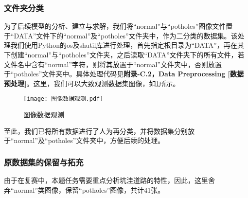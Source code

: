 \documentclass{MathorCupmodeling}
\begin{document}
\begin{table}[H]
	\centering
	\caption{异常标注图片的处理}
	\label{tab:异常图片处理}
\end{table}

  
	\subsubsection{文件夹分类}
	为了后续模型的分析、建立与求解，我们将“normal”与“potholes”图像文件置于“DATA”文件下的“normal”及“potholes”文件夹中，作为二分类的数据集。该处理我们使用Python的os及shutil库进行处理，首先指定根目录为“DATA”，再在其下创建“normal”与“potholes”文件夹，之后读取“DATA”文件夹下的所有文件，若文件名中含有“normal”字符，则将其放置于“normal”文件夹中，否则放置于“potholes”文件夹中。具体处理代码见\textbf{附录-C.2，Data Preprocessing [数据预处理]}。这里，我们可以大致观测数据集图像，如\textcolor{blue}{\cref{fig:图像数据观测}}所示。
	\begin{figure}[H]
		\centering
		\texttt{[image: 图像数据观测.pdf]}
		\caption{图像数据观测}
		\label{fig:图像数据观测}
	\end{figure}
	至此，我们已将所有数据进行了人为再分类，并将数据集分别放于“normal”及“potholes”文件夹中，方便后续的处理。
	
	\subsubsection{原数据集的保留与拓充}
	由于在复赛中，本题任务需要重点分析坑洼道路的特性，因此，这里舍弃“normal”类图像，保留“potholes”图像，共计41张。
\end{document}
